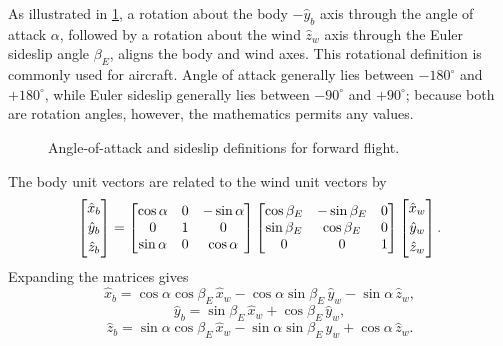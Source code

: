 
As illustrated in \cref{fig:alpha-betae-definitions}, a rotation about the body
$-\hat y_b$ axis through the angle of attack $\alpha$, followed by a rotation about
the wind $\hat z_w$ axis through the Euler sideslip angle $\beta_E$, aligns the
body and wind axes. This rotational definition is commonly used for aircraft.
Angle of attack generally lies between $-180^\circ$ and $+180^\circ$, while Euler
sideslip generally lies between $-90^\circ$ and $+90^\circ$; because both are
rotation angles, however, the mathematics permits any values.

\begin{figure}[htbp]
  \centering
  \resizebox{0.78\linewidth}{!}{}
  \caption{Angle-of-attack and sideslip definitions for forward flight.}
  \label{fig:alpha-betae-definitions}
\end{figure}

The body unit vectors are related to the wind unit vectors by
\begin{equation}
  \begin{bmatrix}
    \hat x_b\\[0.2em]
    \hat y_b\\[0.2em]
    \hat z_b
  \end{bmatrix}
  =
  \begin{bmatrix} \cos \alpha & 0 & -\sin \alpha \\ 0 & 1 & 0 \\ \sin \alpha & 0 & \cos \alpha \end{bmatrix}
  \begin{bmatrix} \cos \beta_E & -\sin \beta_E & 0 \\ \sin \beta_E & \cos \beta_E & 0 \\ 0 & 0 & 1 \end{bmatrix}
  \begin{bmatrix}
    \hat x_w\\[0.2em]
    \hat y_w\\[0.2em]
    \hat z_w
  \end{bmatrix}.
  \label{eq:wind-to-body-aero-transformation}
\end{equation}
Expanding the matrices gives
\begin{equation}
  \hat x_b
  =\cos\alpha\cos\beta_E\,\hat x_w
  -\cos\alpha\sin\beta_E\,\hat y_w
  -\sin\alpha\,\hat z_w,
  \label{eq:body-x-from-aero-angles}
\end{equation}
\begin{equation}
  \hat y_b
  =\sin\beta_E\,\hat x_w
  +\cos\beta_E\,\hat y_w,
  \label{eq:body-y-from-aero-angles}
\end{equation}
\begin{equation}
  \hat z_b
  =\sin\alpha\cos\beta_E\,\hat x_w
  -\sin\alpha\sin\beta_E\,\hat y_w
  +\cos\alpha\,\hat z_w.
  \label{eq:body-z-from-aero-angles}
\end{equation}

